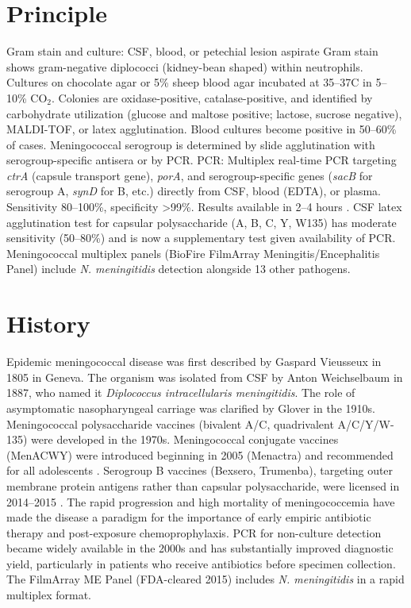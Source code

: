 \section*{Principle}
Gram stain and culture: CSF, blood, or petechial lesion aspirate Gram stain shows gram-negative diplococci (kidney-bean shaped) within neutrophils. Cultures on chocolate agar or 5\% sheep blood agar incubated at 35--37\textdegree{}C in 5--10\% CO$_2$. Colonies are oxidase-positive, catalase-positive, and identified by carbohydrate utilization (glucose and maltose positive; lactose, sucrose negative), MALDI-TOF, or latex agglutination. Blood cultures become positive in 50--60\% of cases. Meningococcal serogroup is determined by slide agglutination with serogroup-specific antisera or by PCR. PCR: Multiplex real-time PCR targeting \textit{ctrA} (capsule transport gene), \textit{porA}, and serogroup-specific genes (\textit{sacB} for serogroup A, \textit{synD} for B, etc.) directly from CSF, blood (EDTA), or plasma. Sensitivity 80--100\%, specificity >99\%. Results available in 2--4 hours \cite{brouwer2010epidemiology}. CSF latex agglutination test for capsular polysaccharide (A, B, C, Y, W135) has moderate sensitivity (50--80\%) and is now a supplementary test given availability of PCR. Meningococcal multiplex panels (BioFire FilmArray Meningitis/Encephalitis Panel) include \textit{N. meningitidis} detection alongside 13 other pathogens.

\section*{History}
Epidemic meningococcal disease was first described by Gaspard Vieusseux in 1805 in Geneva. The organism was isolated from CSF by Anton Weichselbaum in 1887, who named it \textit{Diplococcus intracellularis meningitidis}. The role of asymptomatic nasopharyngeal carriage was clarified by Glover in the 1910s. Meningococcal polysaccharide vaccines (bivalent A/C, quadrivalent A/C/Y/W-135) were developed in the 1970s. Meningococcal conjugate vaccines (MenACWY) were introduced beginning in 2005 (Menactra) and recommended for all adolescents \cite{cohn2013prevention}. Serogroup B vaccines (Bexsero, Trumenba), targeting outer membrane protein antigens rather than capsular polysaccharide, were licensed in 2014--2015 \cite{cohn2013prevention}. The rapid progression and high mortality of meningococcemia have made the disease a paradigm for the importance of early empiric antibiotic therapy and post-exposure chemoprophylaxis. PCR for non-culture detection became widely available in the 2000s and has substantially improved diagnostic yield, particularly in patients who receive antibiotics before specimen collection. The FilmArray ME Panel (FDA-cleared 2015) includes \textit{N. meningitidis} in a rapid multiplex format.

